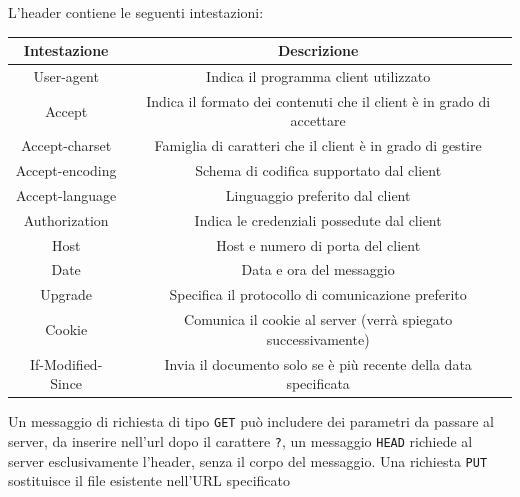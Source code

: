 \documentclass[12pt, letterpaper]{article}
\newcommand{\code}[1]{\colorbox{light-gray}{\texttt{#1}}}
\begin{document}
L'header contiene le seguenti intestazioni:\begin{center}
    \begin{tabular}{|c|c|}
        \hline
        \rowcolor[HTML]{C0C0C0}
        \textbf{Intestazione} & \textbf{Descrizione}                                                  \\ \hline
        \rowcolor[HTML]{FFFFFF}
        User-agent            & Indica il programma client utilizzato                                 \\ \hline
        \rowcolor[HTML]{FFFFFF}
        Accept                & Indica il formato dei contenuti che il client è in grado di accettare \\ \hline
        \rowcolor[HTML]{FFFFFF}
        Accept-charset        & Famiglia di caratteri che il client è in grado di gestire             \\ \hline
        Accept-encoding       & Schema di codifica supportato dal client                              \\ \hline
        Accept-language       & Linguaggio preferito dal client                                       \\ \hline
        Authorization         & Indica le credenziali possedute dal client                            \\ \hline
        \rowcolor[HTML]{FFFFFF}
        Host                  & Host e numero di porta del client                                     \\ \hline
        \rowcolor[HTML]{FFFFFF}
        Date                  & Data e ora del messaggio                                              \\ \hline
        \rowcolor[HTML]{FFFFFF}
        Upgrade               & Specifica il protocollo di comunicazione preferito                    \\ \hline
        Cookie                & Comunica il cookie al server (verrà spiegato successivamente)         \\ \hline
        If-Modified-Since     & Invia il documento solo se è più recente della data specificata       \\ \hline
    \end{tabular}
\end{center}
Un messaggio di richiesta di tipo \code{GET} può includere dei parametri da passare al server, da inserire
nell'url dopo il carattere \code{?}, un messaggio \code{HEAD} richiede al server esclusivamente l'header,
senza il corpo del messaggio. Una richiesta \code{PUT} sostituisce il file esistente nell'URL specificato
\end{document}
